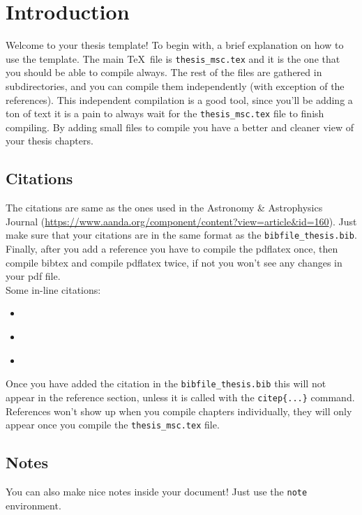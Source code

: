 \documentclass[../../main/thesis_msc.tex]{subfiles}
\begin{document}
    \chapter{Introduction}

    Welcome to your thesis template! To begin with, a brief explanation on how to use the template. The main \TeX\, file is \texttt{thesis\_msc.tex} and it is the one that you should be able to compile always. The rest of the files are gathered in subdirectories, and you can compile them independently (with exception of the references). This independent compilation is a good tool, since you'll be adding a ton of text it is a pain to always wait for the \texttt{thesis\_msc.tex} file to finish compiling. By adding small files to compile you have a better and cleaner view of your thesis chapters.



    \section{Citations}
    The citations are same as the ones used in the Astronomy \& Astrophysics Journal (\url{https://www.aanda.org/component/content?view=article&id=160}). Just make sure that your citations are in the same format as the \texttt{bibfile\_thesis.bib}. Finally, after you add a reference you have to compile the pdflatex once, then compile bibtex and compile pdflatex twice, if not you won't see any changes in your pdf file. \\

    \noindent Some in-line citations:
    \begin{itemize}
        \item \citep{bracewell1978fourier}
        \item \citet{bracewell1978fourier}
        \item \citep[see][]{bracewell1978fourier}
    \end{itemize}

    Once you have added the citation in the \texttt{bibfile\_thesis.bib} this will not appear in the reference section, unless it is called with the \texttt{citep\{...\}} command. References won't show up when you compile chapters individually, they will only appear once you compile the \texttt{thesis\_msc.tex} file.

    \section{Notes}
    You can also make nice notes inside your document! Just use the \texttt{note} environment.
\end{document}
